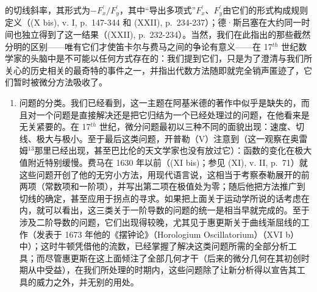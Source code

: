 的切线斜率，其形式为\(-F_{x}^{\prime}/F_{y}^{\prime}\)，其中“导出多项式”\(F_{x}^{\prime}\)、\(F_{y}^{\prime}\)由它们的形式构成规则定义（(X bis), v. I, p.~147-344 和 (XXII), p.~234-237）；德·斯吕塞在大约同一时间也独立得到了这一结果（(XXII), p.~232-234）。当然，我们在此指出的那些截然分明的区别——唯有它们才使笛卡尔与费马之间的争论有意义——在 17\(^{th}\) 世纪数学家的头脑中是不可能以任何方式存在的：我们提到它们，只是为了澄清与我们所关心的历史相关的最奇特的事件之一，并指出代数方法随即就完全销声匿迹了，它们暂时被微分方法吸收了。

\begin{enumerate}
\def\labelenumi{\Alph{enumi})}
\setcounter{enumi}{3}
\tightlist
\item
  问题的分类。我们已经看到，这一主题在阿基米德的著作中似乎是缺失的，而且对一个问题是直接解决还是把它归结为一个已经处理过的问题，在他看来是无关紧要的。在 17\(^{th}\) 世纪，微分问题最初以三种不同的面貌出现：速度、切线、极大与极小。至于最后这类问题，开普勒（V）注意到（这一观察在奥雷姆\(^{13}\)那里已经出现，甚至巴比伦的天文学家也没有放过它）：函数的变化在极大值附近特别缓慢。费马在 1630 年以前（(XI bis)；参见 (XI), v. II, p.~71）就这些问题开创了他的无穷小方法，用现代语言说，这相当于考察泰勒展开的前两项（常数项和一阶项），并写出第二项在极值处为零；随后他把方法推广到切线的确定，甚至应用于拐点的寻求。如果把上面关于运动学所说的话考虑在内，就可以看出，这三类关于一阶导数的问题的统一是相当早就完成的。至于涉及二阶导数的问题，它们出现得较晚，尤其见于惠更斯关于曲线渐屈线的工作（发表于 1673 年他的《摆钟论》（Horologium Oscillatorium）（XVI b）中）；这时牛顿凭借他的流数，已经掌握了解决这类问题所需的全部分析工具；而尽管惠更斯在这上面倾注了全部几何才干（后来的微分几何在其初创时期从中受益），在我们所处理的时期内，这些问题除了让新分析得以宣告其工具的威力之外，并无别的用处。
\end{enumerate}

